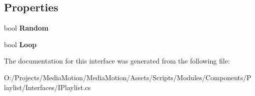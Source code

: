 \subsection*{Properties}
\begin{DoxyCompactItemize}
\item 
\hypertarget{interface_media_motion_1_1_modules_1_1_components_1_1_playlist_1_1_i_playlist_ad33154fb3b673835f80f5021813c15cb}{bool {\bfseries Random}}\label{interface_media_motion_1_1_modules_1_1_components_1_1_playlist_1_1_i_playlist_ad33154fb3b673835f80f5021813c15cb}

\item 
\hypertarget{interface_media_motion_1_1_modules_1_1_components_1_1_playlist_1_1_i_playlist_a88003650ca0f4779df2fe2b409be7e09}{bool {\bfseries Loop}}\label{interface_media_motion_1_1_modules_1_1_components_1_1_playlist_1_1_i_playlist_a88003650ca0f4779df2fe2b409be7e09}

\end{DoxyCompactItemize}


The documentation for this interface was generated from the following file\+:\begin{DoxyCompactItemize}
\item 
O\+:/\+Projects/\+Media\+Motion/\+Media\+Motion/\+Assets/\+Scripts/\+Modules/\+Components/\+Playlist/\+Interfaces/I\+Playlist.\+cs\end{DoxyCompactItemize}
